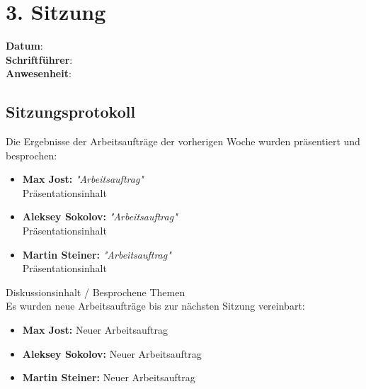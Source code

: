 \section{3. Sitzung}
\label{sec:3_sitzung}

\textbf{Datum}:\\
\textbf{Schriftführer}:\\
\textbf{Anwesenheit}: 

\subsection*{Sitzungsprotokoll}

Die Ergebnisse der Arbeitsaufträge der vorherigen Woche wurden präsentiert und besprochen:
\begin{itemize}
    \item \textbf{Max Jost:} \textit{"Arbeitsauftrag"}\\
    Präsentationsinhalt
    \item \textbf{Aleksey Sokolov:} \textit{"Arbeitsauftrag"}\\
    Präsentationsinhalt
    \item \textbf{Martin Steiner:} \textit{"Arbeitsauftrag"}\\
    Präsentationsinhalt
\end{itemize}

Diskussionsinhalt / Besprochene Themen \\


Es wurden neue Arbeitsaufträge bis zur nächsten Sitzung vereinbart:

\begin{itemize}
    \item \textbf{Max Jost:} Neuer Arbeitsauftrag
    \item \textbf{Aleksey Sokolov:} Neuer Arbeitsauftrag
    \item \textbf{Martin Steiner:} Neuer Arbeitsauftrag
\end{itemize}

\newpage